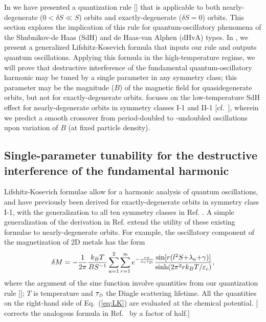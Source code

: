 \documentclass[aps, showpacs, twocolumn, notitlepage, superscriptaddress]{revtex4-1}
\begin{document}
In  we have presented a quantization rule [] that is applicable to both nearly-degenerate ($0{<}\delta S{\ll}S$) orbits and exactly-degenerate ($\delta S{=}0$) orbits. This section explores the implication of this rule for quantum-oscillatory phenomena of the Shubnikov-de Haas (SdH)\cite{SdH} and de Haas-van Alphen (dHvA)\cite{dHvA} types. In , we present a generalized Lifshitz-Kosevich formula\cite{lifshitz_kosevich,lifshitz_kosevich_jetp} that inputs our rule and outputs quantum oscillations. Applying this formula in the high-temperature regime, we will prove that  destructive interference of the fundamental quantum-oscillatory harmonic may  be tuned by a single parameter in any symmetry class; this parameter may be the magnitude ($B$) of the magnetic field for quasidegenerate orbits, but not for exactly-degenerate orbits.  focuses on the low-temperature SdH effect for nearly-degenerate orbits in symmetry classes I-1 and II-1 [cf.\ ], wherein we predict a smooth crossover from period-doubled to -undoubled oscillations upon variation of $B$ (at fixed particle density).

\subsection{Single-parameter tunability for the destructive interference of the fundamental harmonic}\label{sec:quantosc_equidis}

Lifshitz-Kosevich formulae\cite{lifshitz_kosevich,lifshitz_kosevich_jetp} allow for a harmonic analysis of quantum oscillations, and have previously been derived for  exactly-degenerate orbits in symmetry class I-1\cite{rothmag}, with the generalization to all ten symmetry classes in Ref. . A simple generalization of the derivation in Ref.  extend the utility of these existing formulae to nearly-degenerate orbits. For example, the oscillatory component of the magnetization of 2D metals has the form
\begin{equation}
\delta M=-\frac{1}{2\pi}\frac{k_BT}{BS^{-1}}\sum_{a=1}^2\sum_{r=1}^{\infty}e^{-\frac{r\pi}{\omega_c\tau_{\scriptscriptstyle{D}}}} \frac{\text{sin}[r(l^2S{+}\lambda_a{+}\gamma)]}{\text{sinh}(2\pi^2rk_BT/\varepsilon_c)},\label{eq:LK}
\end{equation}
where the argument of the sine function involve quantities from our quantization rule []; $T$ is temperature and $\tau_{\scriptscriptstyle{D}}$  the Dingle scattering lifetime\cite{Dingle_collisions}. All the quantities on the right-hand side of Eq.\ (\ref{eq:LK}) are evaluated at the chemical potential. [ corrects the analogous formula in Ref.\  by a factor of half.]
\end{document}
